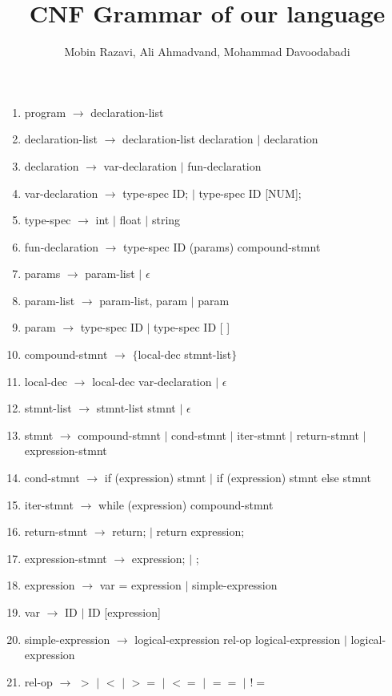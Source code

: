 \documentclass{article}
\begin{document}
\title{CNF Grammar of our language}
\author{Mobin Razavi, Ali Ahmadvand, Mohammad Davoodabadi}
\date{}
\maketitle
\begin{enumerate}
    \item program $\rightarrow$ declaration-list
    \item declaration-list $\rightarrow$ declaration-list   declaration $|$ declaration
    \item declaration $\rightarrow$ var-declaration $|$ fun-declaration
    \item var-declaration $\rightarrow$ type-spec ID; $|$ type-spec ID [NUM];
    \item type-spec $\rightarrow$ int $|$ float $|$ string
    \item fun-declaration $\rightarrow$ type-spec ID (params) compound-stmnt
    \item params $\rightarrow$ param-list $|$ $\epsilon$ 
    \item param-list $\rightarrow$ param-list, param $|$ param
    \item param $\rightarrow$ type-spec ID $|$ type-spec ID [ ]
    \item compound-stmnt $\rightarrow$ $\{$local-dec stmnt-list$\}$
    \item local-dec $\rightarrow$ local-dec var-declaration $|$ $\epsilon$
    \item stmnt-list $\rightarrow$ stmnt-list stmnt $|$ $\epsilon$
    \item stmnt $\rightarrow$ compound-stmnt $|$ cond-stmnt $|$ iter-stmnt $|$ return-stmnt $|$ expression-stmnt
    \item cond-stmnt $\rightarrow$ if (expression) stmnt  $|$ if (expression) stmnt else stmnt
    \item iter-stmnt $\rightarrow$ while (expression) compound-stmnt
    \item return-stmnt $\rightarrow$ return; $|$ return expression;
    \item expression-stmnt $\rightarrow$ expression; $|$ ;
    \item expression $\rightarrow$ var = expression $|$ simple-expression
    \item var $\rightarrow$ ID $|$ ID [expression]
    \item simple-expression $\rightarrow$ logical-expression rel-op logical-expression $|$ logical-expression
    \item rel-op $\rightarrow$ $>$ $|$ $<$ $|$ $>=$ $|$ $<=$ $|$ $==$ $|$ $!=$

\end{enumerate}
\end{document}
